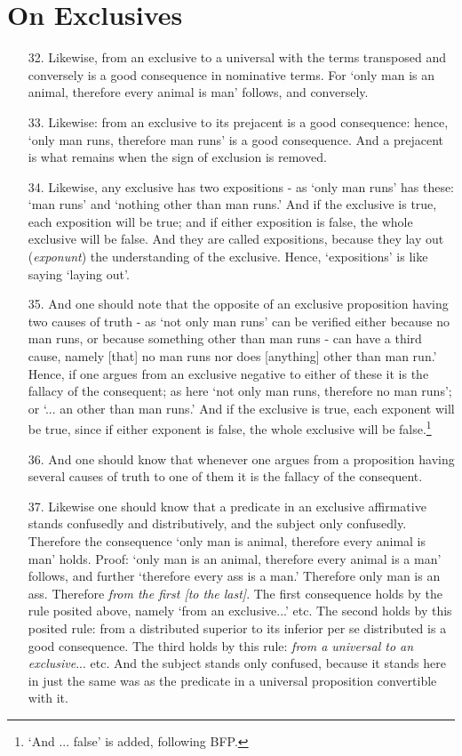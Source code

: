 \documentclass[]{article}
\begin{document}
\section{On Exclusives}
\begin{itemize}
\item[32.] Likewise, from an exclusive to a universal with the terms transposed and conversely is a good consequence in nominative terms. For `only man is an animal, therefore every animal is man' follows, and conversely.
\item[33.] Likewise: from an exclusive to its prejacent is a good consequence: hence, `only man runs, therefore man runs' is a good consequence. And a prejacent is what remains when the sign of exclusion is removed.
\item[34.] Likewise, any exclusive has two expositions - as `only man runs' has these: `man runs' and `nothing other than man runs.' And if the exclusive is true, each exposition will be true; and if either exposition is false, the whole exclusive will be false. And they are called expositions, because they lay out (\textit{exponunt}) the understanding of the exclusive. Hence,  `expositions' is like saying `laying out'.
\item[35.] And one should note that the opposite of an exclusive proposition having two causes of truth - as `not only man runs' can be verified either because no man runs, or because something other than man runs - can have a third cause, namely [that] no man runs nor does [anything] other than man run.' Hence, if one argues from an exclusive negative to either of these it is the fallacy of the consequent; as here `not only man runs, therefore no man runs'; or `... an other than man runs.' And if the exclusive is true, each exponent will be true, since if either exponent is false, the whole exclusive will be false.\footnote{`And ... false' is added, following BFP.}
\item[36.] And one should know that whenever one argues from a proposition having several causes of truth to one of them it is the fallacy of the consequent.
\item[37.] Likewise one should know that a predicate in an exclusive affirmative stands confusedly and distributively, and the subject only confusedly. Therefore the consequence `only man is animal, therefore every animal is man' holds. Proof: `only man is an animal, therefore every animal is a man' follows, and further `therefore every ass is a man.' Therefore only man is an ass.  Therefore \textit{from the first [to the last]}. The first consequence holds by the rule posited above, namely `from an exclusive...' etc. The second holds by this posited rule: from a distributed superior to its inferior per se distributed is a good consequence. The third holds by this rule: \textit{from a universal to an exclusive}... etc. And the subject stands only confused, because it stands here in just the same was as the predicate in a universal proposition convertible with it.

\end{itemize}
\end{document}
